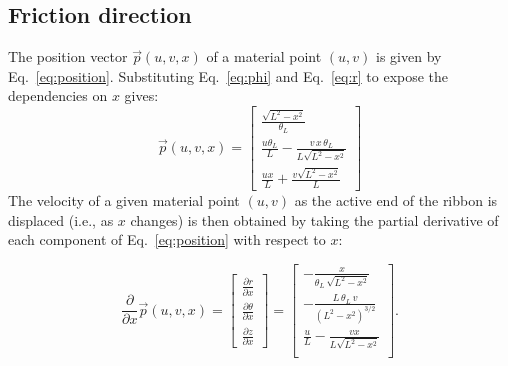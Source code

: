 \documentclass[11pt]{article}
\begin{document}
\subsection{Friction direction}\label{sec:slip_direction}
The position vector $\vec p(u,v,x)$ of a material point $(u,v)$ is given by Eq.~\eqref{eq:position}. Substituting Eq.~\eqref{eq:phi} and Eq.~\eqref{eq:r} to expose the dependencies on $x$ gives:
\begin{equation}
    \vec{p}(u,v,x) =
    \begin{bmatrix}
        \frac{\sqrt{L^2 -x^2 }}{\theta_L }\\
        \frac{u\theta_L}{L}-\frac{v\,x\,\theta_L}{L\sqrt{L^2 -x^2 }}\\
        \frac{ux}{L}+\frac{v\sqrt{L^2 -x^2 }}{L}
    \end{bmatrix}
\end{equation}
The velocity of a given material point $(u,v)$ as the active end of the ribbon is displaced (i.e., as $x$ changes) is then obtained by taking the partial derivative of each component of Eq.~\eqref{eq:position} with respect to $x$:

\begin{equation}\label{eq:velocity}
    \frac{\partial}{\partial x} \vec{p}(u,v,x) =
    \begin{bmatrix}
        \frac{\partial r}{\partial x}\\
        \frac{\partial \theta}{\partial x}\\
        \frac{\partial z}{\partial x}
    \end{bmatrix}=
    \begin{bmatrix}
        -\frac{x}{\theta_L \,\sqrt{L^2 -x^2 }}\\
        -\frac{L\,\theta_L\,v}{{\left(L^2-x^2\right)}^{3/2}}\\
        \frac{u}{L}-\frac{vx}{L\sqrt{L^2 -x^2 }}\\
    \end{bmatrix}.
\end{equation}
\end{document}
